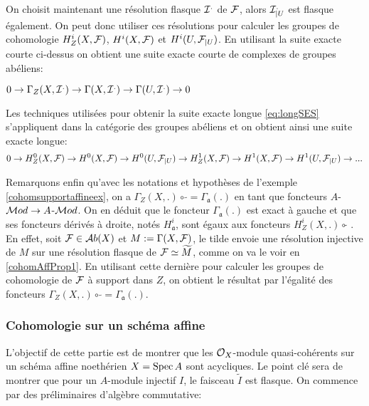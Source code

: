 On choisit maintenant une résolution flasque $\mathcal{I}^.$ de $\mathcal{F}$, alors $\mathcal{I}^._{|U}$ est flasque également. On peut donc utiliser ces résolutions pour calculer les groupes de cohomologie $H_Z^i(X,\mathcal{F})$, $H^i(X,\mathcal{F})$ et $H^i(U,\mathcal{F}_{|U})$. En utilisant la suite exacte courte ci-dessus on obtient une suite exacte courte de complexes de groupes abéliens:

\begin{center}
$0\rightarrow \Gamma_Z(X,\mathcal{I}^.)\rightarrow \Gamma(X,\mathcal{I}^.)\rightarrow \Gamma(U,\mathcal{I}^.)\rightarrow 0$
\end{center}

Les techniques utilisées pour obtenir la suite exacte longue \ref{eq:longSES} s'appliquent dans la catégorie des groupes abéliens et on obtient ainsi une suite exacte longue:
\begin{equation}\label{eq:longSESSupport}
0\rightarrow H_Z^0(X,\mathcal{F})\rightarrow H^0(X,\mathcal{F})\rightarrow H^0(U,\mathcal{F}_{|U})\rightarrow  H_Z^1(X,\mathcal{F})\rightarrow H^1(X,\mathcal{F})\rightarrow H^1(U,\mathcal{F}_{|U})\rightarrow ...
\end{equation}


Remarquons enfin qu'avec les notations et hypothèses de l'exemple \ref{cohomsupportaffineex}, on a $\Gamma_Z(X, .)\circ\, \widetilde{}=\Gamma_\mathfrak{a}(.)$ en tant que foncteurs $A$-$\mathcal{M} od\rightarrow A$-$\mathcal{M} od$. On en déduit que le foncteur $\Gamma_\mathfrak{a}(.)$ est exact à gauche et que ses foncteurs dérivés à droite, notés $H_\mathfrak{a}^i$, sont égaux aux foncteurs $H_Z^i(X,.)\circ \widetilde{}$ . En effet, soit $\mathcal{F} \in \mathcal{A} b(X)$ et $M:=\Gamma(X,\mathcal{F})$, le tilde envoie une résolution injective de $M$ sur une résolution flasque de $\mathcal{F}\simeq \widetilde{M}$, comme on va le voir en \ref{cohomAffProp1}. En utilisant cette dernière pour calculer les groupes de cohomologie de $\mathcal{F}$ à support dans $Z$, on obtient le résultat par l'égalité des foncteurs $\Gamma_Z(X, .)\circ\, \widetilde{}=\Gamma_\mathfrak{a}(.)$.

\subsubsection{Cohomologie sur un schéma affine}

L'objectif de cette partie est de montrer que les $\mathcal{O}_X$-module quasi-cohérents sur un schéma affine noethérien $X=\operatorname{Spec} A$ sont acycliques. Le point clé sera de montrer que pour un $A$-module injectif $I$, le faisceau $\widetilde{I}$ est flasque. On commence par des préliminaires d'algèbre commutative:

